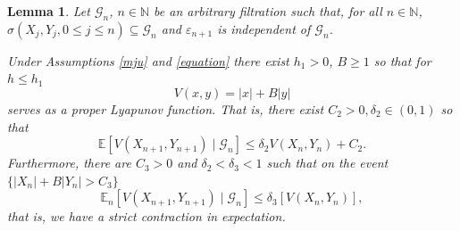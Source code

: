 \documentclass{article}
\newtheorem{lemma}[theorem]{Lemma}
\def\mE{\mathbb{E}}
\begin{document}
\begin{lemma}\label{foster-lyapunov} Let $\mathcal{G}_{n}$, $n\in\mathbb{N}$ be an arbitrary
filtration such that, for all $n\in\mathbb{N}$, 
$\sigma(X_{j},Y_{j},0\leq j\leq n)\subseteq\mathcal{G}_{n}$ and $\varepsilon_{n+1}$ is independent of $\mathcal{G}_{n}$.

    Under Assumptions \ref{mju} and \ref{equation} there exist $h_1>0$, $B\geq 1$ so that for $h\leq h_1$ 
    \[
    V(x,y) = |x|+B|y|
    \]
    serves as a proper Lyapunov function. That is, there exist $C_2>0, \delta_2\in(0,1)$ so that
    \begin{equation}\label{nemo}
    \mE[V(X_{n+1},Y_{n+1})\mid\mathcal{G}_{n}]\leq \delta_2 V(X_{n},Y_{n})+C_2.
    \end{equation}
        Furthermore, there are $C_{3}>0$ and $\delta_2<\delta_3<1$ such that on the event
$\{|X_n|+B|Y_n|>C_3\}$
\begin{equation}
    \label{eq:lyap_contraction}
    \mE_n[V(X_{n+1},Y_{n+1})\mid\mathcal{G}_{n}]\leq \delta_3 [V(X_{n},Y_{n})],
\end{equation}
that is, we have a strict contraction in expectation.
\end{lemma}
\end{document}
